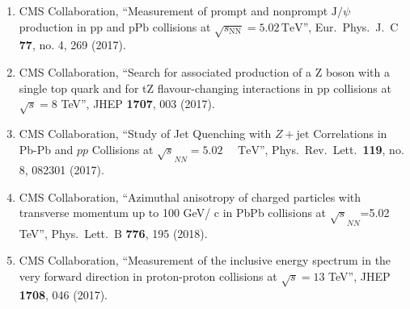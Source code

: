 \begin{enumerate}
\item CMS Collaboration, ``Measurement of prompt and nonprompt $\mathrm{J}/{\psi }$ production in $\mathrm {p}\mathrm {p}$ and $\mathrm {p}\mathrm {Pb}$ collisions at $\sqrt{s_{\mathrm {NN}}} =5.02\,\text {TeV} $'', Eur.\ Phys.\ J.\ C {\bf 77}, no. 4, 269 (2017).

\item CMS Collaboration, ``Search for associated production of a Z boson with a single top quark and for tZ flavour-changing interactions in pp collisions at $ \sqrt{s}=8 $ TeV'', JHEP {\bf 1707}, 003 (2017).

\item CMS Collaboration, ``Study of Jet Quenching with $Z+\text{jet}$ Correlations in Pb-Pb and $pp$ Collisions at ${\sqrt{s}}_{NN}=5.02\text{ }\text{ }\mathrm{TeV}$'', Phys.\ Rev.\ Lett.\  {\bf 119}, no. 8, 082301 (2017).

\item CMS Collaboration, ``Azimuthal anisotropy of charged particles with transverse momentum up to 100 GeV/ c in PbPb collisions at $\sqrt {s}_{{NN}}$=5.02 TeV'', Phys.\ Lett.\ B {\bf 776}, 195 (2018).

\item CMS Collaboration, ``Measurement of the inclusive energy spectrum in the very forward direction in proton-proton collisions at $ \sqrt{s}=13 $ TeV'', JHEP {\bf 1708}, 046 (2017).


\end{enumerate}
